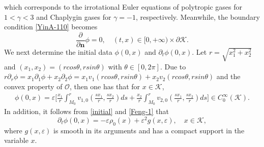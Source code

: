 \documentclass[11pt,twoside]{article}
\def\cK{\mathcal K}
\def\cO{\mathcal O}
\def\f{\frac}
\def\p{\partial}
\def\ve{\varepsilon}
\def\bn{\mathbf{n}}
\theoremstyle{plain}
\theoremstyle{definition}
\numberwithin{equation}{section}
\begin{document}
which corresponds to the irrotational Euler equations of polytropic gases for $1<\gamma<3$ and Chaplygin gases for $\gamma=-1$, respectively.
Meanwhile, the boundary condition \eqref{YinA-110} becomes
\begin{equation}\label{YinA-1100}
\f{\p}{\p\bn}\phi=0, \quad (t,x)\in[0,+\infty)\times\p\cK.
\end{equation}
We next determine the initial data $\phi(0,x)$ and $\p_t\phi(0,x)$.
Let $r=\sqrt{x_1^2+x_2^2}$ and $(x_1,x_2)=(r cos\theta, r sin\theta)$ with $\theta\in [0, 2 \pi]$.
Due to $r\p_r\phi=x_1\p_1\phi+x_2\p_2\phi=x_1v_1(r cos\theta, r sin\theta)+x_2v_2(r cos\theta, r sin\theta)$
and the convex property of  $\cO$, then one has that for $x\in \cK$,
\begin{equation}\label{initial-00}
\begin{split}
\phi(0,x)=\ve\bigg[ \f{x_1}{r}\int_{M_0}^rv_{1,0}(\f{sx_1}{r}, \f{sx_2}{r})ds+ \f{x_2}{r}\int_{M_0}^rv_{2,0}(\f{sx_1}{r}, \f{sx_2}{r})ds\bigg]
\in C_0^{\infty}(\cK).
\end{split}
\end{equation}
In addition, it follows from \eqref{initial} and \eqref{Feng-1} that
\begin{equation}\label{initial-00-1}
\p_t\phi(0,x)=-\ve\rho_0(x)+\ve^2g(x,\ve),\quad x\in\cK,
\end{equation}
where $g(x,\ve)$ is smooth in its arguments and has a compact support in the variable $x$.
\end{document}
